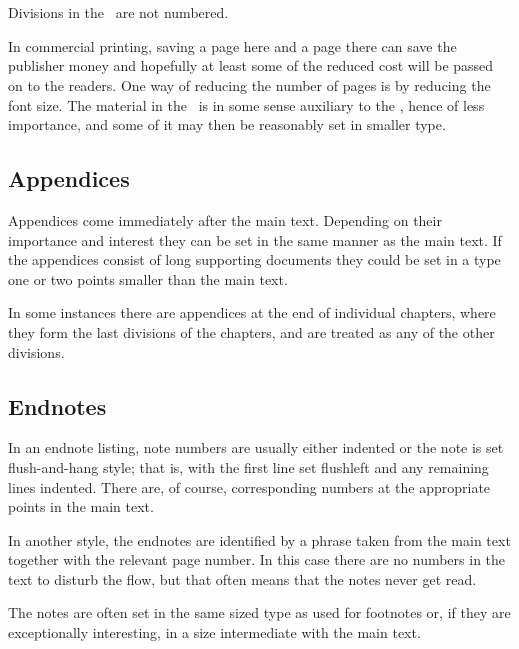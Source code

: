 \documentclass[10pt,a4paper,oneside,extrafontsizes]{memoir}%
\begin{document}
\renewcommand*{\thefootnote}{\arabic{footnote}}

\section{\prBackmatter}

\begin{paracol}{2}
\switchEng
    Divisions in the \pixbackmatter\ are not numbered.

    In commercial printing, saving a page here and a page there can save the
publisher money and hopefully at least some of the reduced cost will be passed
on to the readers. One way of reducing the number of pages is by reducing
the font size. The material in the \pixbackmatter\ is in some sense auxiliary 
to the \pixmainmatter, hence of less importance, and some of it may then be 
reasonably set in smaller type.
\end{paracol}

\subsection{Appendices}

\begin{paracol}{2}
\switchEng
    Appendices come immediately after the main text. Depending
on their importance and interest they can be set in the same manner as the 
main text. If the appendices consist of long supporting documents they could
be set in a type one or two points smaller than the main text.

    In some instances there are appendices at the end of individual chapters,
where they form the last divisions of the chapters, and are treated as any of
the other divisions.
\end{paracol}

\subsection{Endnotes}

\begin{paracol}{2}
\switchEng
   In an endnote listing, note numbers are usually 
either indented or the note
is set flush-and-hang style; that is, with the 
first line set flushleft and any remaining lines indented. There are, 
of course, corresponding numbers at the appropriate points in the main text.

   In another style, the endnotes are identified by a phrase taken from the 
main text together with the relevant page number. In this case there
are no numbers in the text to disturb the flow, but that often means that the
notes never get read.

    The notes are often set in the same sized type as used for footnotes or,
if they are exceptionally interesting, in a size intermediate with the main 
text.
\end{paracol}
\end{document}
